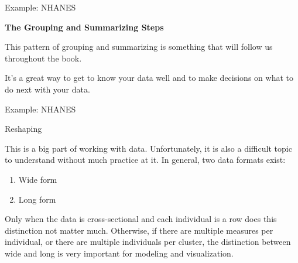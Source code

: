 \documentclass[ignorenonframetext,]{beamer}
\providecommand{\tightlist}{%
\setlength{\itemsep}{0pt}\setlength{\parskip}{0pt}}
\begin{document}
\begin{frame}{Example: NHANES}

\centering
\textbf{The Grouping and Summarizing Steps}

This pattern of grouping and summarizing is something that will follow
us throughout the book.

It's a great way to get to know your data well and to make decisions on
what to do next with your data.

\end{frame}

\begin{frame}{Example: NHANES}

\begin{block}{Reshaping}

This is a big part of working with data. Unfortunately, it is also a
difficult topic to understand without much practice at it. In general,
two data formats exist:

\begin{enumerate}
\def\labelenumi{\arabic{enumi}.}
\tightlist
\item
  Wide form
\item
  Long form
\end{enumerate}

Only when the data is cross-sectional and each individual is a row does
this distinction not matter much. Otherwise, if there are multiple
measures per individual, or there are multiple individuals per cluster,
the distinction between wide and long is very important for modeling and
visualization.

\end{block}

\end{frame}
\end{document}
